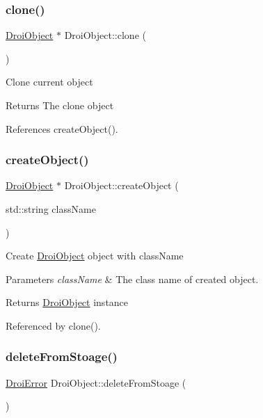 \subsubsection{\texorpdfstring{clone()}{clone()}}
{\footnotesize\ttfamily \hyperlink{class_droi_object}{Droi\+Object} $\ast$ Droi\+Object\+::clone (\begin{DoxyParamCaption}{ }\end{DoxyParamCaption})}

Clone current object \begin{DoxyReturn}{Returns}
The clone object 
\end{DoxyReturn}


References create\+Object().

\mbox{\label{class_droi_object_af2570fc1461d2917f4f69444619e6600}} 
\subsubsection{\texorpdfstring{create\+Object()}{createObject()}}
{\footnotesize\ttfamily \hyperlink{class_droi_object}{Droi\+Object} $\ast$ Droi\+Object\+::create\+Object (\begin{DoxyParamCaption}\item[{std\+::string}]{class\+Name }\end{DoxyParamCaption})\hspace{0.3cm}{\ttfamily [static]}}

Create \hyperlink{class_droi_object}{Droi\+Object} object with class\+Name 
\begin{DoxyParams}{Parameters}
{\em class\+Name} & The class name of created object. \\
\hline
\end{DoxyParams}
\begin{DoxyReturn}{Returns}
\hyperlink{class_droi_object}{Droi\+Object} instance 
\end{DoxyReturn}


Referenced by clone().

\mbox{\label{class_droi_object_ad79798fa3fc66256edfdb2ac85b1dc9c}} 
\subsubsection{\texorpdfstring{delete\+From\+Stoage()}{deleteFromStoage()}}
{\footnotesize\ttfamily \hyperlink{class_droi_error}{Droi\+Error} Droi\+Object\+::delete\+From\+Stoage (\begin{DoxyParamCaption}{ }\end{DoxyParamCaption})\hspace{0.3cm}{\ttfamily [virtual]}}


